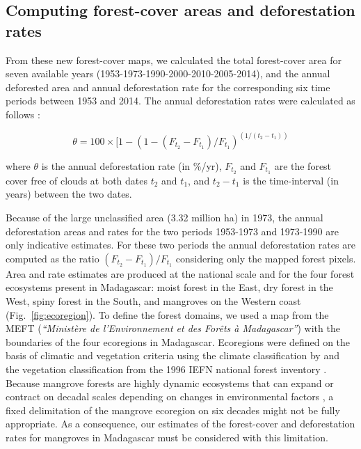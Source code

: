 \documentclass[a4paper, 12pt, leqno]{article} %
\begin{document}
\subsection{Computing forest-cover areas and deforestation
rates}

From these new forest-cover maps, we calculated the total forest-cover
area for seven available years (1953-1973-1990-2000-2010-2005-2014),
and the annual deforested area and annual deforestation rate for the
corresponding six time periods between 1953 and 2014. The annual
deforestation rates were calculated as follows \citep{Puyravaud2003,
  Vieilledent2013}:

\begin{equation}
  \theta = 100 \times [1-(1-(F_{t_2}-F_{t_1})/F_{t_1})^{(1/(t_2-t_1))}
\end{equation}

where $\theta$ is the annual deforestation rate (in \%/yr),
$F_{t_2}$ and $F_{t_1}$ are the forest cover free of clouds at both
dates $t_2$ and $t_1$, and $t_2-t_1$ is the time-interval (in
years) between the two dates.

Because of the large unclassified area (3.32 million ha) in 1973, the
annual deforestation areas and rates for the two periods 1953-1973 and
1973-1990 are only indicative estimates. For these two periods the
annual deforestation rates are computed as the ratio
$(F_{t_2}-F_{t_1})/F_{t_1}$ considering only the mapped forest pixels.
Area and rate estimates are produced at the national scale and for the
four forest ecosystems present in Madagascar: moist forest in the
East, dry forest in the West, spiny forest in the South, and mangroves
on the Western coast (Fig.~\ref{fig:ecoregion}). To define the forest
domains, we used a map from the MEFT (\emph{``Ministère de
  l'Environnement et des Forêts à Madagascar''}) with the boundaries
of the four ecoregions in Madagascar.  Ecoregions were defined on the
basis of climatic and vegetation criteria using the climate
classification by \citet{Cornet1974} and the vegetation classification
from the 1996 IEFN national forest inventory \citep{IEFN1996}. Because
mangrove forests are highly dynamic ecosystems that can expand or
contract on decadal scales depending on changes in environmental
factors \citep{Armitage2015}, a fixed delimitation of the mangrove
ecoregion on six decades might not be fully appropriate. As a
consequence, our estimates of the forest-cover and deforestation rates
for mangroves in Madagascar must be considered with this limitation.
\end{document}
